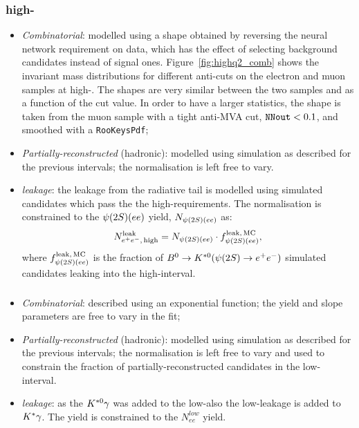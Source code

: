 \subsubsection*{\BdToKstee high-\qsq}
%
\begin{itemize}

\item \textit{Combinatorial}: modelled using a shape obtained by reversing the neural network requirement on data,
which has the effect of selecting background candidates instead of signal ones.
Figure~\ref{fig:highq2_comb} shows the invariant mass distributions for different anti-cuts on the electron 
and muon samples at high-\qsq. The shapes are very similar between the two samples and as a function 
of the cut value. In order to have a larger statistics, the shape is taken from the muon sample with a tight
anti-MVA cut, $\verb!NNout! < 0.1$, and smoothed with a \texttt{RooKeysPdf};

\item \textit{Partially-reconstructed} (hadronic): modelled using simulation as described for the previous intervals;
 the normalisation is left free to vary.

\item \textit{\BdToKstPsi leakage}: the leakage from the \psitwos radiative tail is modelled using simulated 
\BdToKstPsiee candidates which pass the the high-\qsq requirements. The normalisation is constrained to 
the $\psitwos(ee)$ yield, $N_{\psitwos(ee)}$ as:
%
$$N_{\ee, \, {\rm high}}^{\rm leak} = N_{\psitwos(ee)} \cdot f_{\psitwos(ee)}^{\rm leak, \,MC},$$
%
where $f_{\psitwos(ee)}^{\rm leak, \,MC}$ is the fraction of $\Bd\to\Kstarz(\psitwos\to\ee)$ simulated candidates
leaking into the high-\qsq interval.

\end{itemize}

\subsubsection*{\BdToKstG}

\begin{itemize}

\item \textit{Combinatorial}: described using an exponential function; the yield and slope parameters are free to vary in the fit;

\item \textit{Partially-reconstructed} (hadronic): modelled using simulation as described for the previous intervals;
 the normalisation is left free to vary and used to constrain the fraction of partially-reconstructed candidates in the low-\qsq interval.

\item \textit{\BdToKstee leakage}: as the ${{K}^{*0}}\gamma$ was added to the low-\qsq also the low-\qsq leakage is added
to ${{K}^*}\gamma$. The yield is constrained to the $N_{ee}^{low}$ yield.

\end{itemize}

